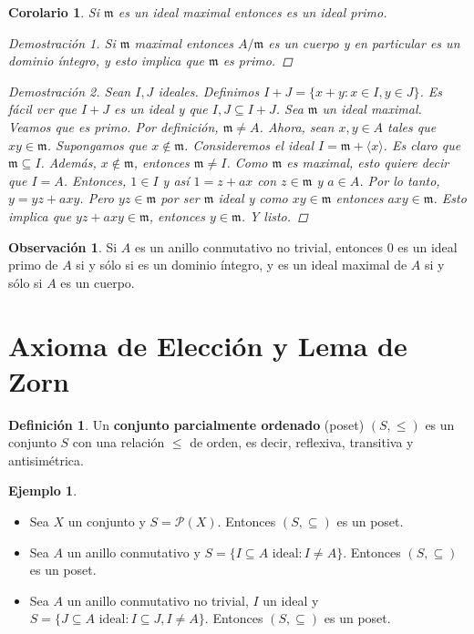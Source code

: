 \documentclass[12pt]{book}
\newtheorem{cor}[teo]{Corolario}
\theoremstyle{definition}
\newtheorem{obs}[teo]{Observación}
\newtheorem{defn}[teo]{Definición}
\newtheorem{ex}[teo]{Ejemplo}
\begin{document}
\begin{cor}
Si $\mathfrak{m}$ es un ideal maximal entonces es un ideal primo.
\begin{proof}[Demostración 1]
Si $\mathfrak{m}$ maximal entonces $A/\mathfrak{m}$ es un cuerpo y en particular es un dominio íntegro, y esto implica que $\mathfrak{m}$ es primo.
\end{proof}
\begin{proof}[Demostración 2]
Sean $I,J$ ideales. Definimos $I+J = \{x+y : x\in I, y\in J\}$. Es fácil ver que $I+J$ es un ideal y que $I,J\subseteq I+J$. Sea $\mathfrak{m}$ un ideal maximal. Veamos que es primo. Por definición, $\mathfrak{m}\neq A$. Ahora, sean $x,y\in A$ tales que $xy\in \mathfrak{m}$. Supongamos que $x\notin \mathfrak{m}$. Consideremos el ideal $I=\mathfrak{m}+\langle x\rangle$. Es claro que $\mathfrak{m}\subseteq I$. Además, $x\notin \mathfrak{m}$, entonces $\mathfrak{m}\neq I$. Como $\mathfrak{m}$ es maximal, esto quiere decir que $I=A$. Entonces, $1\in I$ y así $1=z+ax$ con $z\in \mathfrak{m}$ y $a\in A$. Por lo tanto, $y=yz+axy$. Pero $yz\in \mathfrak{m}$ por ser $\mathfrak{m}$ ideal y como $xy\in \mathfrak{m}$ entonces $axy\in \mathfrak{m}$. Esto implica que $yz+axy\in \mathfrak{m}$, entonces $y\in \mathfrak{m}$. Y listo.
\end{proof}
\end{cor}

\begin{obs}
Si $A$ es un anillo conmutativo no trivial, entonces $0$ es un ideal primo de $A$ si y sólo si es un dominio íntegro, y es un ideal maximal de $A$ si y sólo si $A$ es un cuerpo.
\end{obs}

\section{Axioma de Elección y Lema de Zorn}

\begin{defn}
Un \textbf{conjunto parcialmente ordenado} (poset) $(S,\leq)$ es un conjunto $S$ con una relación $\leq$ de orden, es decir, reflexiva, transitiva y antisimétrica.
\end{defn}

\begin{ex}
\begin{itemize}
\item Sea $X$ un conjunto y $S=\mathcal{P}(X)$. Entonces $(S,\subseteq)$ es un poset.
\item Sea $A$ un anillo conmutativo y $S=\{I\subseteq A \text{ ideal} : I\neq A\}$. Entonces $(S,\subseteq)$ es un poset.
\item Sea $A$ un anillo conmutativo no trivial, $I$ un ideal y $S=\{J\subseteq A \text{ ideal} : I\subseteq J, I\neq A\}$. Entonces $(S,\subseteq)$ es un poset.
\end{itemize}
\end{ex}
\end{document}
